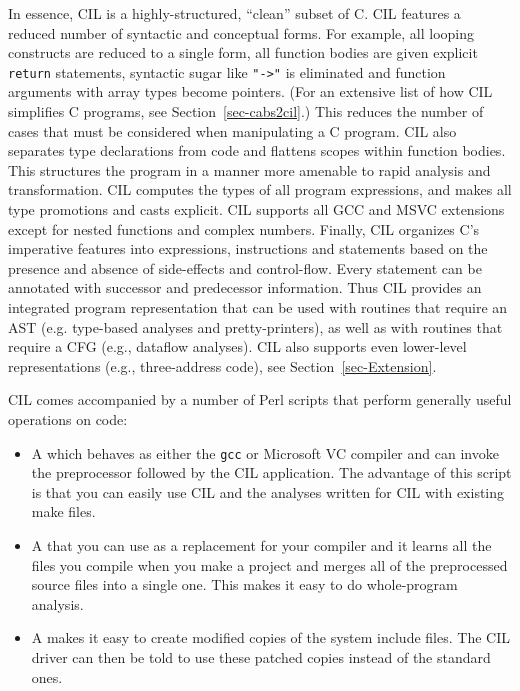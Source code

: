 \documentclass{article}
\def\secref#1{Section~\ref{sec-#1}}
\def\t#1{{\tt #1}}
\begin{document}
 In essence, CIL is a highly-structured, ``clean'' subset of C. CIL features a
reduced number of syntactic and conceptual forms. For example, all looping
constructs are reduced to a single form, all function bodies are given
explicit {\tt return} statements, syntactic sugar like {\tt "->"} is
eliminated and function arguments with array types become pointers. (For an
extensive list of how CIL simplifies C programs, see \secref{cabs2cil}.)
This reduces the number of cases that must be considered when manipulating a C
program. CIL also separates type declarations from code and flattens scopes
within function bodies. This structures the program in a manner more amenable
to rapid analysis and transformation. CIL computes the types of all program
expressions, and makes all type promotions and casts explicit. CIL supports
all GCC and MSVC extensions except for nested functions and complex numbers.
Finally, CIL organizes C's imperative features into expressions, instructions
and statements based on the presence and absence of side-effects and
control-flow. Every statement can be annotated with successor and predecessor
information. Thus CIL provides an integrated program representation that can
be used with routines that require an AST (e.g. type-based analyses and
pretty-printers), as well as with routines that require a CFG (e.g., dataflow
analyses). CIL also supports even lower-level representations (e.g.,
three-address code), see \secref{Extension}. 

 CIL comes accompanied by a number of Perl scripts that perform generally
useful operations on code:
\begin{itemize}
\item A  which behaves as either the \t{gcc} or
Microsoft VC compiler and can invoke the preprocessor followed by the CIL
application. The advantage of this script is that you can easily use CIL and
the analyses written for CIL with existing make files.
\item A  that you can use as a
replacement for your compiler and it learns all the files you compile when you
make a project and merges all of the preprocessed source files into a single
one. This makes it easy to do whole-program analysis.
\item A  makes it easy to create modified
copies of the system include files. The CIL driver can then be told to use
these patched copies instead of the standard ones.
\end{itemize}
\end{document}
